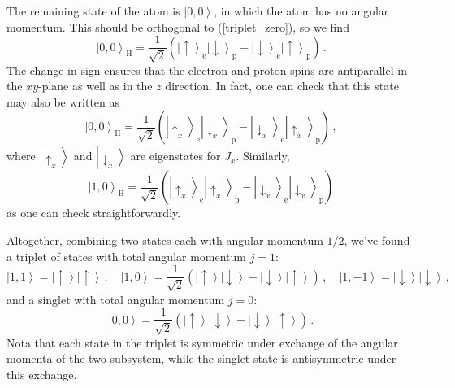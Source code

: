 \documentclass{article}
\theoremstyle{plain}\theoremheaderfont{\normalfont\itshape}\theorembodyfont{\rmfamily}\theoremseparator{.}\newtheorem*{rem}{Remark}\newtheorem*{ex}{Example}\newtheorem*{proof}{Proof}\newtheorem*{altp}{Alternative proof}
\theoremstyle{plain}\theoremheaderfont{\normalfont\bfseries}\theorembodyfont{\rmfamily}\theoremseparator{.}\newtheorem{thm}{Theorem}[section]\newtheorem{lem}[thm]{Lemma}\newtheorem{prop}[thm]{Proposition}\newtheorem*{cor}{Corollary}\newtheorem{defn}[thm]{Definition}\newtheorem{clm}[thm]{Claim}\newtheorem{clminproof}{Claim}
\theoremstyle{break}\theoremheaderfont{\normalfont\itshape}\theorembodyfont{\rmfamily}\theoremseparator{.\medskip}\newtheorem*{proofskip}{Proof}\newtheorem*{exs}{Examples}\newtheorem*{rems}{Remarks}
\theoremstyle{break}\theoremheaderfont{\normalfont\bfseries}\theorembodyfont{\rmfamily}\theoremseparator{.\medskip}\newtheorem{lemskip}[thm]{Lemma}\newtheorem{defnskip}[thm]{Definition}\newtheorem{propskip}[thm]{Proposition}\newtheorem{thmskip}[thm]{Theorem}
\numberwithin{equation}{section}
\newcommand{\ket}[1]{\left| #1 \right\rangle}
\begin{document}
    The remaining state of the atom is \(\ket{0,0}\), in which the atom has no angular momentum. This should be orthogonal to (\ref{triplet_zero}), so we find
    \begin{equation}
        \ket{0,0}_{\mathrm{H}}=\frac{1}{\sqrt{2}}\left(\ket{\uparrow}_{\mathrm{e}}\ket{\downarrow}_{\mathrm{p}}-\ket{\downarrow}_{\mathrm{e}}\ket{\uparrow}_{\mathrm{p}}\right)\,.
    \end{equation}
    The change in sign ensures that the electron and proton spins are antiparallel in the \(xy\)-plane as well as in the \(z\) direction. In fact, one can check that this state may also be written as
    \begin{equation}
        \ket{0,0}_{\mathrm{H}}=\frac{1}{\sqrt{2}}\left(\ket{\uparrow_x}_{\mathrm{e}}\ket{\downarrow_x}_{\mathrm{p}}-\ket{\downarrow_x}_{\mathrm{e}}\ket{\uparrow_x}_{\mathrm{p}}\right)\,,
    \end{equation}
    where \(\ket{\uparrow_x}\) and \(\ket{\downarrow_x}\) are eigenstates for \(J_x\). Similarly,
    \begin{equation}
        \ket{1,0}_{\mathrm{H}}=\frac{1}{\sqrt{2}}\left(\ket{\uparrow_x}_{\mathrm{e}}\ket{\uparrow_x}_{\mathrm{p}}-\ket{\downarrow_x}_{\mathrm{e}}\ket{\downarrow_x}_{\mathrm{p}}\right)
    \end{equation}
    as one can check straightforwardly.

    Altogether, combining two states each with angular momentum \(1/2\), we've found a triplet of states with total angular momentum \(j=1\):
    \begin{equation}
        \ket{1,1}=\ket{\uparrow}\ket{\uparrow}\,,\quad\ket{1,0}=\frac{1}{\sqrt{2}}\left(\ket{\uparrow}\ket{\downarrow}+\ket{\downarrow}\ket{\uparrow}\right)\,,\quad\ket{1,-1}=\ket{\downarrow}\ket{\downarrow}\,,
    \end{equation}
    and a singlet with total angular momentum \(j=0\):
    \begin{equation}
        \ket{0,0}=\frac{1}{\sqrt{2}}\left(\ket{\uparrow}\ket{\downarrow}-\ket{\downarrow}\ket{\uparrow}\right)\,.
    \end{equation}
    Nota that each state in the triplet is symmetric under exchange of the angular momenta of the two subsystem, while the singlet state is antisymmetric under this exchange.
\end{document}
